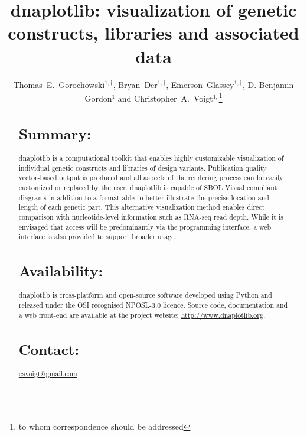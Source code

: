 \documentclass{bioinfo}
\begin{document}

\title[dnaplotlib]{dnaplotlib: visualization of genetic constructs, libraries and associated data}
\author[Thomas E. Gorochowski \textit{et~al.}]{Thomas~E.~Gorochowski$^{1,\dagger}$, Bryan~Der$^{1,\dagger}$, Emerson~Glassey$^{1,\dagger}$, D. Benjamin Gordon$^{1}$ and Christopher~A.~Voigt$^{1,}$\footnote{to whom correspondence should be addressed}}
\address{$^{1}$Department of Biological Engineering, Synthetic Biology Center, Massachusetts Institute of Technology, USA.\\
$^{\dagger}$These authors contributed equally to this work.}




\maketitle

\begin{abstract}

\section{Summary:}
dnaplotlib is a computational toolkit that enables highly customizable visualization of individual genetic constructs and libraries of design variants. Publication quality vector-based output is produced and all aspects of the rendering process can be easily customized or replaced by the user. dnaplotlib is capable of SBOL Visual compliant diagrams in addition to a format able to better illustrate the precise location and length of each genetic part. This alternative visualization method enables direct comparison with nucleotide-level information such as RNA-seq read depth. While it is envisaged that access will be predominantly via the programming interface, a web interface is also provided to support broader usage.

\section{Availability:}
dnaplotlib is cross-platform and open-source software developed using Python and released under the OSI recognised NPOSL-3.0 licence. Source code, documentation and a web front-end are available at the project website: \href{http://www.dnaplotlib.org}{http://www.dnaplotlib.org}.

\section{Contact:} \href{cavoigt@gmail.com}{cavoigt@gmail.com}
\end{abstract}
\end{document}
